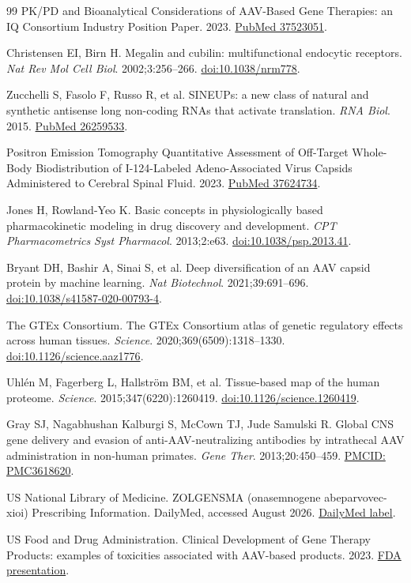 \documentclass[UTF8,11pt,a4paper]{ctexart}
\begin{document}
\begin{thebibliography}{99}
PK/PD and Bioanalytical Considerations of AAV-Based Gene Therapies: an IQ Consortium Industry Position Paper. 2023. \href{https://pubmed.ncbi.nlm.nih.gov/37523051/}{PubMed 37523051}.

Christensen EI, Birn H. Megalin and cubilin: multifunctional endocytic receptors. \textit{Nat Rev Mol Cell Biol}. 2002;3:256--266. \href{https://doi.org/10.1038/nrm778}{doi:10.1038/nrm778}.

Zucchelli S, Fasolo F, Russo R, et al. SINEUPs: a new class of natural and synthetic antisense long non-coding RNAs that activate translation. \textit{RNA Biol}. 2015. \href{https://pubmed.ncbi.nlm.nih.gov/26259533/}{PubMed 26259533}.

Positron Emission Tomography Quantitative Assessment of Off-Target Whole-Body Biodistribution of I-124-Labeled Adeno-Associated Virus Capsids Administered to Cerebral Spinal Fluid. 2023. \href{https://pubmed.ncbi.nlm.nih.gov/37624734/}{PubMed 37624734}.

Jones H, Rowland-Yeo K. Basic concepts in physiologically based pharmacokinetic modeling in drug discovery and development. \textit{CPT Pharmacometrics Syst Pharmacol}. 2013;2:e63. \href{https://doi.org/10.1038/psp.2013.41}{doi:10.1038/psp.2013.41}.

Bryant DH, Bashir A, Sinai S, et al. Deep diversification of an AAV capsid protein by machine learning. \textit{Nat Biotechnol}. 2021;39:691--696. \href{https://doi.org/10.1038/s41587-020-00793-4}{doi:10.1038/s41587-020-00793-4}.

The GTEx Consortium. The GTEx Consortium atlas of genetic regulatory effects across human tissues. \textit{Science}. 2020;369(6509):1318--1330. \href{https://doi.org/10.1126/science.aaz1776}{doi:10.1126/science.aaz1776}.

Uhl\'{e}n M, Fagerberg L, Hallstr\"{o}m BM, et al. Tissue-based map of the human proteome. \textit{Science}. 2015;347(6220):1260419. \href{https://doi.org/10.1126/science.1260419}{doi:10.1126/science.1260419}.

Gray SJ, Nagabhushan Kalburgi S, McCown TJ, Jude Samulski R. Global CNS gene delivery and evasion of anti-AAV-neutralizing antibodies by intrathecal AAV administration in non-human primates. \textit{Gene Ther}. 2013;20:450--459. \href{https://pmc.ncbi.nlm.nih.gov/articles/PMC3618620/}{PMCID: PMC3618620}.

US National Library of Medicine. ZOLGENSMA (onasemnogene abeparvovec-xioi) Prescribing Information. DailyMed, accessed August 2026. \href{https://dailymed.nlm.nih.gov/dailymed/lookup.cfm?setid=68cd4f06-70e1-40d8-bedb-609ec0afa471}{DailyMed label}.

US Food and Drug Administration. Clinical Development of Gene Therapy Products: examples of toxicities associated with AAV-based products. 2023. \href{https://www.fda.gov/media/167536/download}{FDA presentation}.

\end{thebibliography}
\end{document}
